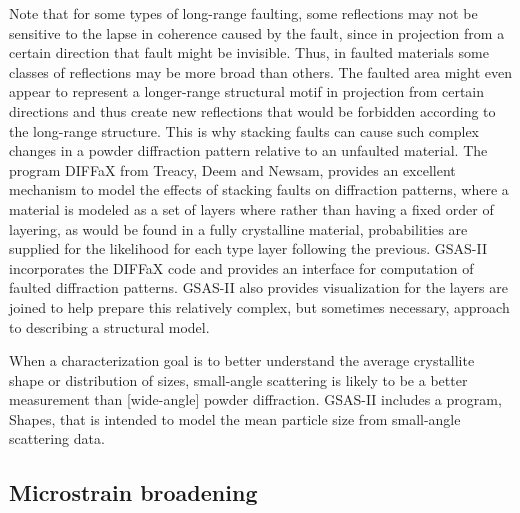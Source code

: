  Note that for some types of long-range faulting, some reflections may not be sensitive to the lapse in coherence caused by the fault, since in projection from a certain direction that fault might be invisible. Thus, in faulted materials some classes of reflections may be more broad than others. The faulted area might even appear to represent a longer-range structural motif in projection from certain directions and thus create new reflections that would be forbidden according to the long-range structure. This is why stacking faults can cause such complex changes in a powder diffraction pattern relative to an unfaulted material. The program DIFFaX from Treacy, Deem and Newsam, provides an excellent mechanism to model the effects of stacking faults on diffraction patterns, where a material is modeled as a set of layers where rather than having a fixed order of layering, as would be found in a fully crystalline material, probabilities are supplied for the likelihood for each type layer following the previous. GSAS-II incorporates the DIFFaX code and provides an interface for computation of faulted diffraction patterns. GSAS-II also provides visualization for the layers are joined to help prepare this relatively complex, but sometimes necessary, approach to describing a structural model. 

 When a characterization goal is to better understand the average crystallite shape or distribution of sizes, small-angle scattering is likely to be a better measurement than [wide-angle] powder diffraction. GSAS-II includes a program, Shapes, that is intended to model the mean particle size from small-angle scattering data. 

 

\subsection{Microstrain broadening}

